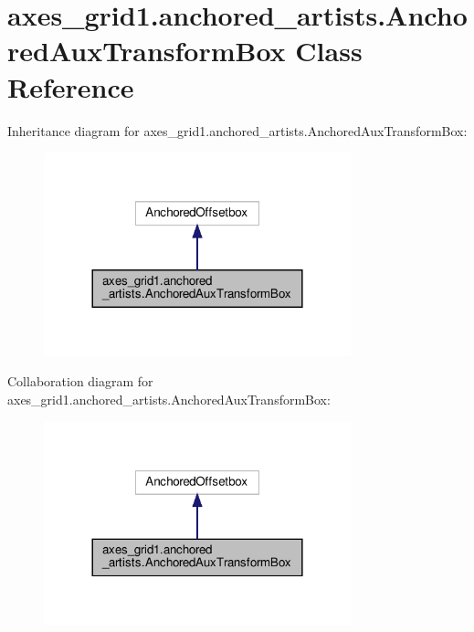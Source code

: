 \hypertarget{classaxes__grid1_1_1anchored__artists_1_1AnchoredAuxTransformBox}{}\section{axes\+\_\+grid1.\+anchored\+\_\+artists.\+Anchored\+Aux\+Transform\+Box Class Reference}
\label{classaxes__grid1_1_1anchored__artists_1_1AnchoredAuxTransformBox}


Inheritance diagram for axes\+\_\+grid1.\+anchored\+\_\+artists.\+Anchored\+Aux\+Transform\+Box\+:
\nopagebreak
\begin{figure}[H]
\begin{center}
\leavevmode
\includegraphics[width=252pt]{classaxes__grid1_1_1anchored__artists_1_1AnchoredAuxTransformBox__inherit__graph}
\end{center}
\end{figure}


Collaboration diagram for axes\+\_\+grid1.\+anchored\+\_\+artists.\+Anchored\+Aux\+Transform\+Box\+:
\nopagebreak
\begin{figure}[H]
\begin{center}
\leavevmode
\includegraphics[width=252pt]{classaxes__grid1_1_1anchored__artists_1_1AnchoredAuxTransformBox__coll__graph}
\end{center}
\end{figure}
